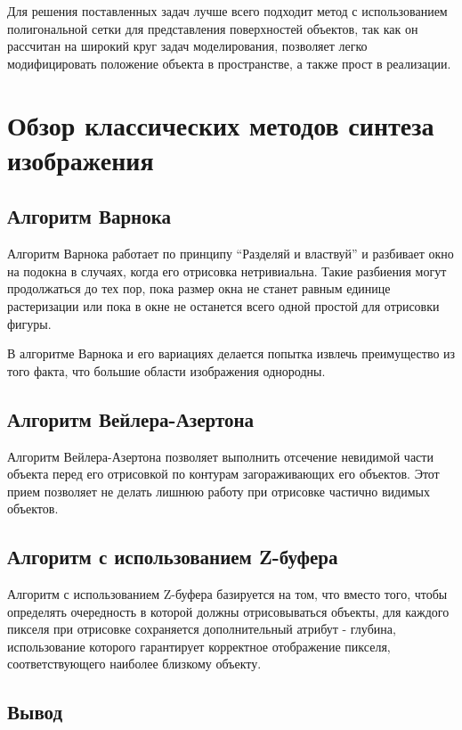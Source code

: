 Для решения поставленных задач лучше всего подходит метод с использованием полигональной сетки для представления поверхностей объектов, так как он рассчитан на широкий круг задач моделирования, позволяет легко модифицировать положение объекта в пространстве, а также прост в реализации.

\section{Обзор классических методов синтеза изображения}

\subsection{Алгоритм Варнока}

Алгоритм Варнока работает по принципу “Разделяй и властвуй” и разбивает окно на подокна в случаях, когда его отрисовка нетривиальна. Такие разбиения могут продолжаться до тех пор, пока размер окна не станет равным единице растеризации или пока в окне не останется всего одной простой для отрисовки фигуры.

В алгоритме Варнока и его вариациях делается попытка извлечь преимущество из того факта, что большие области изображения однородны.

\subsection{Алгоритм Вейлера-Азертона}

Алгоритм Вейлера-Азертона позволяет выполнить отсечение невидимой части объекта перед его отрисовкой по контурам загораживающих его объектов. Этот прием позволяет не делать лишнюю работу при отрисовке частично видимых объектов.

\subsection{Алгоритм с использованием Z-буфера}

Алгоритм с использованием Z-буфера базируется на том, что вместо того, чтобы определять очередность в которой должны отрисовываться объекты, для каждого пикселя при отрисовке сохраняется дополнительный атрибут - глубина, использование которого гарантирует корректное отображение пикселя, соответствующего наиболее близкому объекту.

\subsection{Вывод}

